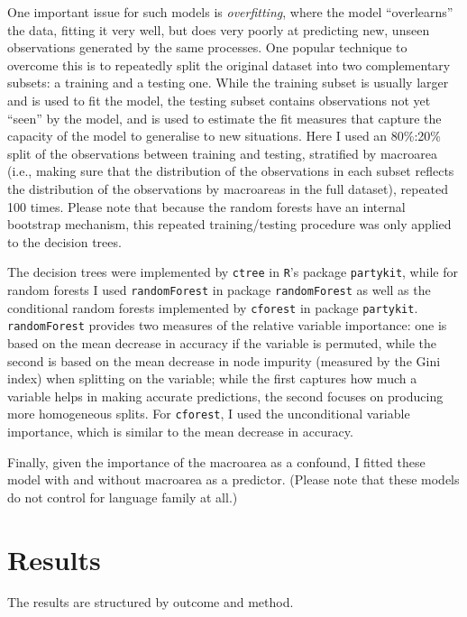 \documentclass[twoside,onecolumn]{article}
\begin{document}
One important issue for such models is \emph{overfitting}, where the model ``overlearns'' the data, fitting it very well, but does very poorly at predicting new, unseen observations generated by the same processes.
One popular technique to overcome this is to repeatedly split the original dataset into two complementary subsets: a training and a testing one.
While the training subset is usually larger and is used to fit the model, the testing subset contains observations not yet ``seen'' by the model, and is used to estimate the fit measures that capture the capacity of the model to generalise to new situations.
Here I used an 80\%:20\% split of the observations between training and testing, stratified by macroarea (i.e., making sure that the distribution of the observations in each subset reflects the distribution of the observations by macroareas in the full dataset), repeated 100 times.
Please note that because the random forests have an internal bootstrap mechanism, this repeated training/testing procedure was only applied to the decision trees.

The decision trees were implemented by \texttt{ctree} in \texttt{R}'s package \texttt{partykit}, while for random forests I used \texttt{randomForest} in package \texttt{randomForest} as well as the conditional random forests implemented by \texttt{cforest} in package \texttt{partykit}.
\texttt{randomForest} provides two measures of the relative variable importance: one is based on the mean decrease in accuracy if the variable is permuted, while the second is based on the mean decrease in node impurity (measured by the Gini index) when splitting on the variable; while the first captures how much a variable helps in making accurate predictions, the second focuses on producing more homogeneous splits.
For \texttt{cforest}, I used the unconditional variable importance, which is similar to the mean decrease in accuracy.

Finally, given the importance of the macroarea as a confound, I fitted these model with and without macroarea as a predictor.
(Please note that these models do not control for language family at all.)



\section{Results}

The results are structured by outcome and method.
\end{document}
